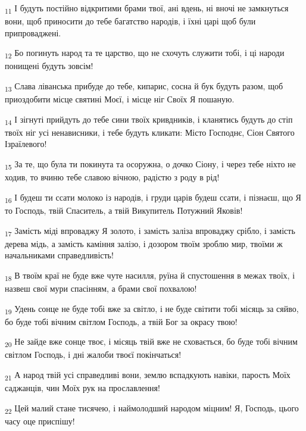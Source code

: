 \begin{tcolorbox}
\textsubscript{11} І будуть постійно відкритими брами твої, ані вдень, ні вночі не замкнуться вони, щоб приносити до тебе багатство народів, і їхні царі щоб були припроваджені.
\end{tcolorbox}
\begin{tcolorbox}
\textsubscript{12} Бо погинуть народ та те царство, що не схочуть служити тобі, і ці народи понищені будуть зовсім!
\end{tcolorbox}
\begin{tcolorbox}
\textsubscript{13} Слава ліванська прибуде до тебе, кипарис, сосна й бук будуть разом, щоб приоздобити місце святині Моєї, і місце ніг Своїх Я пошаную.
\end{tcolorbox}
\begin{tcolorbox}
\textsubscript{14} І зігнуті прийдуть до тебе сини твоїх кривдників, і кланятись будуть до стіп твоїх ніг усі ненависники, і тебе будуть кликати: Місто Господнє, Сіон Святого Ізраїлевого!
\end{tcolorbox}
\begin{tcolorbox}
\textsubscript{15} За те, що була ти покинута та осоружна, о дочко Сіону, і через тебе ніхто не ходив, то вчиню тебе славою вічною, радістю з роду в рід!
\end{tcolorbox}
\begin{tcolorbox}
\textsubscript{16} І будеш ти ссати молоко із народів, і груди царів будеш ссати, і пізнаєш, що Я то Господь, твій Спаситель, а твій Викупитель Потужний Яковів!
\end{tcolorbox}
\begin{tcolorbox}
\textsubscript{17} Замість міді впроваджу Я золото, і замість заліза впроваджу срібло, і замість дерева мідь, а замість каміння залізо, і дозором твоїм зроблю мир, твоїми ж начальниками справедливість!
\end{tcolorbox}
\begin{tcolorbox}
\textsubscript{18} В твоїм краї не буде вже чуте насилля, руїна й спустошення в межах твоїх, і назвеш свої мури спасінням, а брами свої похвалою!
\end{tcolorbox}
\begin{tcolorbox}
\textsubscript{19} Удень сонце не буде тобі вже за світло, і не буде світити тобі місяць за сяйво, бо буде тобі вічним світлом Господь, а твій Бог за окрасу твою!
\end{tcolorbox}
\begin{tcolorbox}
\textsubscript{20} Не зайде вже сонце твоє, і місяць твій вже не сховається, бо буде тобі вічним світлом Господь, і дні жалоби твоєї покінчаться!
\end{tcolorbox}
\begin{tcolorbox}
\textsubscript{21} А народ твій усі справедливі вони, землю вспадкують навіки, парость Моїх саджанців, чин Моїх рук на прославлення!
\end{tcolorbox}
\begin{tcolorbox}
\textsubscript{22} Цей малий стане тисячею, і наймолодший народом міцним! Я, Господь, цього часу оце приспішу!
\end{tcolorbox}
